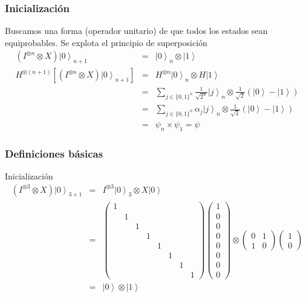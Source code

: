 \begin{frame}
\frametitle{Inicialización}
Buscamos una forma (operador unitario) de que todos los estados sean equiprobables. Se explota el principio de superposición
\pause
\begin{eqnarray}
(I^{\otimes n}\otimes X)\left.|0\right\rangle _{n+1}&=&\left.|0\right\rangle _{n}\otimes\left.|1\right\rangle \nonumber\\
H^{\otimes\left(n+1\right)}\left[(I^{\otimes n}\otimes X)\left.|0\right\rangle _{n+1}\right]&=&H^{\otimes n}\left.|0\right\rangle _{n}\otimes H\left.|1\right\rangle \nonumber\\
&=&\sum_{j\in\{0,1\}^{n}}\frac{1}{\sqrt{2^{n}}}\left.|j\right\rangle _{n}\otimes\frac{1}{\sqrt{2}}\left(\left.|0\right\rangle -\left.|1\right\rangle \right)\nonumber\\
&=&\sum_{j\in\{0,1\}^{n}}\alpha_{j}\left.|j\right\rangle _{n}\otimes\frac{1}{\sqrt{2}}\left(\left.|0\right\rangle -\left.|1\right\rangle \right)\nonumber\\
&=&\psi_{n}\times\psi_{1}=\psi\nonumber
\end{eqnarray}
\end{frame}

\begin{frame}
\frametitle{Definiciones básicas}

\begin{exampleblock}{Inicialización}
\begin{eqnarray}
(I^{\otimes3}\otimes X)\left.|0\right\rangle _{3+1}&=&I^{\otimes3}\left.|0\right\rangle _{3}\otimes X\left.|0\right\rangle \\&=&\left(\begin{array}{cccccccc}
1\\
 & 1\\
 &  & 1\\
 &  &  & 1\\
 &  &  &  & 1\\
 &  &  &  &  & 1\\
 &  &  &  &  &  & 1\\
 &  &  &  &  &  &  & 1
\end{array}\right)\left(\begin{array}{c}
1\\
0\\
0\\
0\\
0\\
0\\
0\\
0
\end{array}\right)\otimes\left(\begin{array}{cc}
0 & 1\\
1 & 0
\end{array}\right)\left(\begin{array}{c}
1\\
0
\end{array}\right)\\&=&\left.|0\right\rangle \otimes\left.|1\right\rangle 
\end{eqnarray}
\end{exampleblock}


\end{frame}

